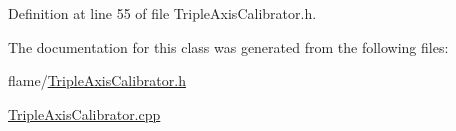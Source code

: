 Definition at line 55 of file Triple\-Axis\-Calibrator.\-h.



The documentation for this class was generated from the following files\-:\begin{DoxyCompactItemize}
\item 
flame/\hyperlink{_triple_axis_calibrator_8h}{Triple\-Axis\-Calibrator.\-h}\item 
\hyperlink{_triple_axis_calibrator_8cpp}{Triple\-Axis\-Calibrator.\-cpp}\end{DoxyCompactItemize}
